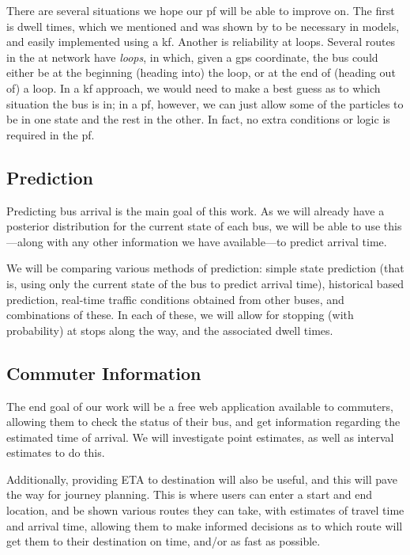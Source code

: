 \documentclass[12pt,a4paper]{article}
\begin{document}
There are several situations we hope our \gls{pf} will be able to improve on.
The first is dwell times, which we mentioned and was shown by 
\cite{hans-etal:2015} to be necessary in models, and easily implemented
using a \gls{kf}.
Another is reliability at loops.
Several routes in the \gls{at} network have \emph{loops},
in which, given a \gls{gps} coordinate, the bus could either be
at the beginning (heading into) the loop, or at the end of (heading out of) a loop.
In a \gls{kf} approach, we would need to make a best guess as to which situation 
the bus is in; 
in a \gls{pf}, however, we can just allow some of the particles to be in one state
and the rest in the other.
In fact, no extra conditions or logic is required in the \gls{pf}.





\subsection{Prediction}
\label{sec:new-prediction}


Predicting bus arrival is the main goal of this work.
As we will already have a posterior distribution for the current state of
each bus, 
we will be able to use this---along with any other information we
have available---to predict arrival time.


We will be comparing various methods of prediction:
simple state prediction (that is, using only the current state of the 
bus to predict arrival time),
historical based prediction,
real-time traffic conditions obtained from other buses,
and combinations of these.
In each of these, we will allow for stopping (with probability) at stops
along the way, and the associated dwell times.




\subsection{Commuter Information}
\label{sec:commuter-info}


The end goal of our work will be a free web application available to
commuters, allowing them to check the status of their bus,
and get information regarding the estimated time of arrival.
We will investigate point estimates, as well as interval estimates to do this.


Additionally, providing ETA to destination will also be useful,
and this will pave the way for journey planning.
This is where users can enter a start and end location,
and be shown various routes they can take,
with estimates of travel time and arrival time,
allowing them to make informed decisions as to which route will get them
to their destination on time, and/or as fast as possible.
\end{document}
